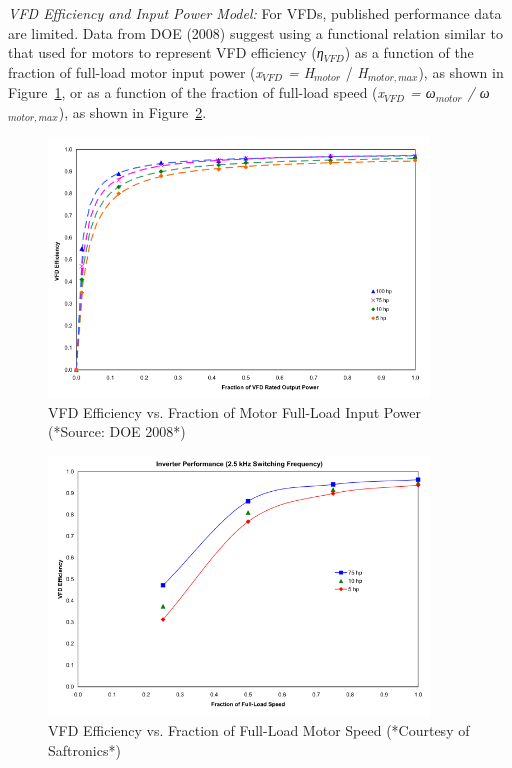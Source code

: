 \emph{VFD Efficiency and Input Power Model:} For VFDs, published performance data are limited. Data from DOE (2008) suggest using a functional relation similar to that used for motors to represent VFD efficiency (\emph{η\(_{VFD}\)}) as a function of the fraction of full-load motor input power (\emph{x\(_{VFD}\) = H\(_{motor}\)} / \emph{H\(_{motor,max}\)}), as shown in Figure~\ref{fig:vfd-efficiency-vs.-fraction-of-motor-full}, or as a function of the fraction of full-load speed (\emph{x\(_{VFD}\) = ω\(_{motor}\) / ω\(_{motor,max}\)}), as shown in Figure~\ref{fig:vfd-efficiency-vs.-fraction-of-full-load}.

\begin{figure}[hbtp] %
\centering
\includegraphics[width=0.9\textwidth, height=0.9\textheight, keepaspectratio=true]{media/image4923.svg.png}
\caption{VFD Efficiency vs. Fraction of Motor Full-Load Input Power (*Source: DOE 2008*) \protect \label{fig:vfd-efficiency-vs.-fraction-of-motor-full}}
\end{figure}

\begin{figure}[hbtp] %
\centering
\includegraphics[width=0.9\textwidth, height=0.9\textheight, keepaspectratio=true]{media/image4924.svg.png}
\caption{VFD Efficiency vs. Fraction of Full-Load Motor Speed (*Courtesy of Saftronics*) \protect \label{fig:vfd-efficiency-vs.-fraction-of-full-load}}
\end{figure}

